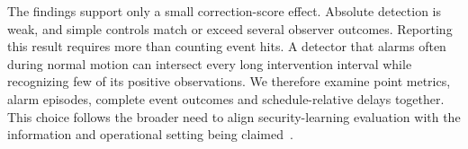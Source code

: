 The findings support only a small correction-score effect. Absolute detection is weak, and simple controls match or exceed several observer outcomes. Reporting this result requires more than counting event hits. A detector that alarms often during normal motion can intersect every long intervention interval while recognizing few of its positive observations. We therefore examine point metrics, alarm episodes, complete event outcomes and schedule-relative delays together. This choice follows the broader need to align security-learning evaluation with the information and operational setting being claimed~\cite{arp2022}.
